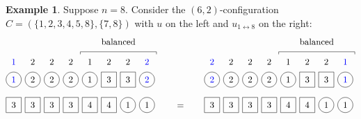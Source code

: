 \documentclass[submission]{FPSAC2018}
\newcommand{\0}{\phantom{c}}
\theoremstyle{plain}
\theoremstyle{definition}
\newtheorem{example}[thm]{Example}
\numberwithin{equation}{section}
\begin{document}
\begin{example}
Suppose $n = 8$.
Consider the $(6,2)$-configuration $C = (\{1,2,3,4,5,8\}, \{7,8\})$ with $u$ on the left and $u_{1 \leftrightarrow 8}$ on the right:
\[
\begin{tikzpicture}[baseline=25]
  \def\sc{0.75}   %
  \def\lll{2.7}   %
  \def\ll{2}   %
  \def\l{1}   %
  \node[color=blue] at (1*\sc,\lll) {$1$};
  \node[color=blue] at (8*\sc,\lll) {$2$};
  \foreach \i in {5} { \node at (\i*\sc,\lll){$1$}; }
  \foreach \i in {2,3,4,6,7} { \node at (\i*\sc,\lll){$2$}; }
  \foreach \i in {1,2,3,4,5,8} { \draw (\i*\sc,\ll) circle (0.3); }
  \foreach \i in {6,7} { \draw (\i*\sc-.3,\ll-.3) rectangle +(0.6,+0.6); }
  \node[color=blue] at (1*\sc,\ll) {$1$};
  \node[color=blue] at (8*\sc,\ll) {$2$};
  \foreach \i in {5} { \node at (\i*\sc,\ll) {$1$}; }
  \foreach \i in {2,3,4} { \node at (\i*\sc,\ll) {$2$}; }
  \foreach \i in {6,7} { \node at (\i*\sc,\ll) {$3$}; }
  \foreach \i in {7,8} { \draw (\i*\sc,\l) circle (0.3); }
  \foreach \i in {1,2,3,4,5,6} { \draw (\i*\sc-.3,\l-.3) rectangle +(0.6,+0.6); }
  \foreach \i in {5,6} { \node at (\i*\sc,\l) {$4$}; }
  \foreach \i in {7,8} { \node at (\i*\sc,\l) {$1$}; }
  \foreach \i in {1,2,3,4} { \node at (\i*\sc,\l) {$3$}; }
  \draw (4.5*\sc,3) -- (4.5*\sc,3.1) -- (8.5*\sc,3.1) -- (8.5*\sc,3);
  \node at (6.5*\sc,3.5) {balanced};
\end{tikzpicture}
\hspace{20pt} = \hspace{20pt}
\begin{tikzpicture}[baseline=25]
  \def\sc{0.75}   %
  \def\lll{2.7}   %
  \def\ll{2}   %
  \def\l{1}   %
  \node[color=blue] at (8*\sc,\lll) {$1$};
  \node[color=blue] at (1*\sc,\lll) {$2$};
  \foreach \i in {5} { \node at (\i*\sc,\lll){$1$}; }
  \foreach \i in {2,3,4,6,7} { \node at (\i*\sc,\lll){$2$}; }
  \foreach \i in {1,2,3,4,5,8} { \draw (\i*\sc,\ll) circle (0.3); }
  \foreach \i in {6,7} { \draw (\i*\sc-.3,\ll-.3) rectangle +(0.6,+0.6); }
  \node[color=blue] at (8*\sc,\ll) {$1$};
  \node[color=blue] at (1*\sc,\ll) {$2$};
  \foreach \i in {5} { \node at (\i*\sc,\ll) {$1$}; }
  \foreach \i in {2,3,4} { \node at (\i*\sc,\ll) {$2$}; }
  \foreach \i in {6,7} { \node at (\i*\sc,\ll) {$3$}; }
  \foreach \i in {7,8} { \draw (\i*\sc,\l) circle (0.3); }
  \foreach \i in {1,2,3,4,5,6} { \draw (\i*\sc-.3,\l-.3) rectangle +(0.6,+0.6); }
  \foreach \i in {5,6} { \node at (\i*\sc,\l) {$4$}; }
  \foreach \i in {7,8} { \node at (\i*\sc,\l) {$1$}; }
  \foreach \i in {1,2,3,4} { \node at (\i*\sc,\l) {$3$}; }
  \draw (4.5*\sc,3) -- (4.5*\sc,3.1) -- (8.5*\sc,3.1) -- (8.5*\sc,3);
  \node at (6.5*\sc,3.5) {balanced};
\end{tikzpicture}
\]
\end{example}
\end{document}
